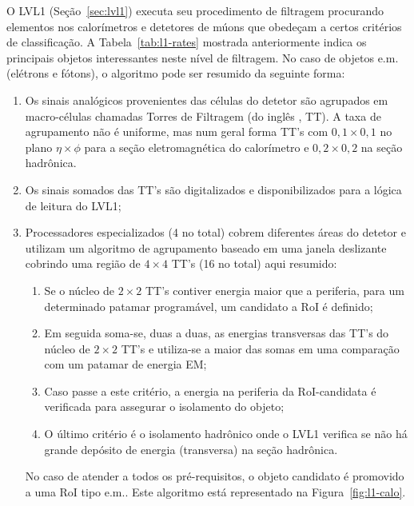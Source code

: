 O LVL1 (Seção~\ref{sec:lvl1}) executa seu procedimento de filtragem procurando
elementos nos calorímetros e detetores de múons que obedeçam a certos
critérios de classificação. A Tabela~\ref{tab:l1-rates} mostrada anteriormente
indica os principais objetos interessantes neste nível de filtragem. No caso
de objetos e.m. (elétrons e fótons), o algoritmo pode ser resumido da seguinte
forma:

\begin{enumerate}
\item Os sinais analógicos provenientes das células do detetor são agrupados
em macro-células chamadas Torres de Filtragem (do inglês ,
TT). A taxa de agrupamento não é uniforme, mas num geral forma TT's com
$0,1\times0,1$ no plano $\eta\times\phi$ para a seção eletromagnética do
calorímetro e $0,2\times0,2$ na seção hadrônica.

\item Os sinais somados das TT's são digitalizados e disponibilizados para a
lógica de leitura do LVL1;

\item Processadores especializados (4 no total) cobrem diferentes áreas do
detetor e utilizam um algoritmo de agrupamento baseado em uma janela
deslizante \cite{l1-tdr} cobrindo uma região de $4\times4$ TT's (16 no
total) aqui resumido:

\begin{enumerate}
\item Se o núcleo de $2\times2$ TT's contiver energia maior que a
periferia, para um determinado patamar programável, um candidato a RoI é
definido;

\item Em seguida soma-se, duas a duas, as energias transversas das TT's do
núcleo de $2\times2$ TT's e utiliza-se a maior das somas em uma comparação com
um patamar de energia EM;

\item Caso passe a este critério, a energia na periferia da RoI-candidata é
verificada para assegurar o isolamento do objeto; 

\item O último critério é o isolamento hadrônico onde o LVL1 verifica se não
há grande depósito de energia (transversa) na seção hadrônica.
\end{enumerate}  

No caso de atender a todos os pré-requisitos, o objeto candidato é promovido a
uma RoI tipo e.m.. Este algoritmo está representado na
Figura~\ref{fig:l1-calo}.
\end{enumerate}

